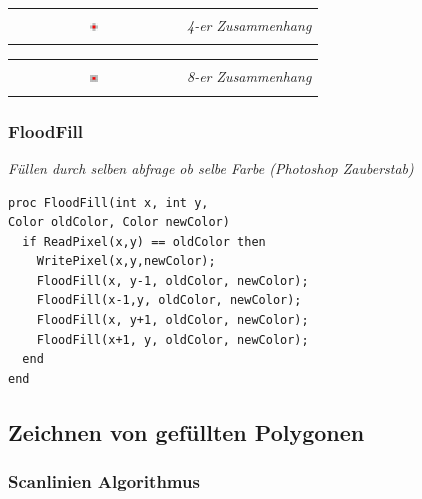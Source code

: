 \begin{tabular}{cl}
    \multirow{3}{*}{
        \includegraphics[width=0.05\textwidth]{assets/region-filling-4.png}
    } & \\
    & \textit{4-er Zusammenhang} \\
    & \\
\end{tabular}
\begin{tabular}{cl}
    \multirow{3}{*}{
        \includegraphics[width=0.05\textwidth]{assets/region-filling-8.png}
    } & \\
    & \textit{8-er Zusammenhang} \\
    & \\
\end{tabular}

\subsubsection{FloodFill}

\textit{Füllen durch selben abfrage ob selbe Farbe (Photoshop Zauberstab)}
\begin{lstlisting}
proc FloodFill(int x, int y,
Color oldColor, Color newColor)
  if ReadPixel(x,y) == oldColor then
    WritePixel(x,y,newColor);
    FloodFill(x, y-1, oldColor, newColor);
    FloodFill(x-1,y, oldColor, newColor);
    FloodFill(x, y+1, oldColor, newColor);
    FloodFill(x+1, y, oldColor, newColor);
  end
end
\end{lstlisting}

\subsection{Zeichnen von gefüllten Polygonen}

\subsubsection{Scanlinien Algorithmus}

